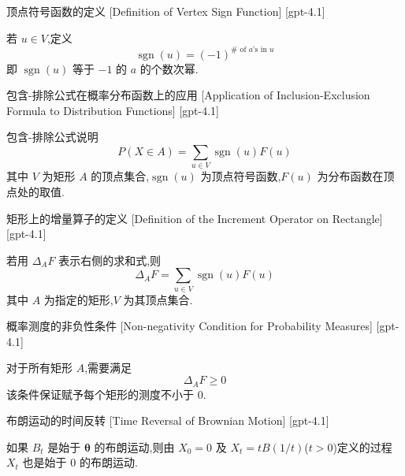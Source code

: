 \documentclass[UTF8]{ctexart}
\begin{document}
    
    
    \begin{dfn}
        {顶点符号函数的定义}
        [Definition of Vertex Sign Function]
        [gpt-4.1]
        
若 $
u \in V$,定义
\[
\operatorname{sgn} ( 
u ) = ( -1 )^{ \# \text{ of } a\text{'s in } 
u }
\]
即 $\operatorname{sgn} ( 
u )$ 等于 $-1$ 的 $a$ 的个数次幂.

    \end{dfn}
    
    
    
    \begin{thm}
        {包含-排除公式在概率分布函数上的应用}
        [Application of Inclusion-Exclusion Formula to Distribution Functions]
        [gpt-4.1]
        
包含-排除公式说明
\[
P ( X \in A ) = \sum_{ 
u \in V } \operatorname{sgn} ( 
u ) F( 
u )
\]
其中 $V$ 为矩形 $A$ 的顶点集合,$\operatorname{sgn}(
u)$ 为顶点符号函数,$F(
u)$ 为分布函数在顶点处的取值.

    \end{thm}
    
    
    
    \begin{dfn}
        {矩形上的增量算子的定义}
        [Definition of the Increment Operator on Rectangle]
        [gpt-4.1]
        
若用 $\Delta_A F$ 表示右侧的求和式,则
\[
\Delta_A F = \sum_{ 
u \in V } \operatorname{sgn} ( 
u ) F( 
u )
\]
其中 $A$ 为指定的矩形,$V$ 为其顶点集合.

    \end{dfn}
    
    
    
    \begin{ppt}
        {概率测度的非负性条件}
        [Non-negativity Condition for Probability Measures]
        [gpt-4.1]
        
对于所有矩形 $A$,需要满足
\[
\Delta_A F \geq 0
\]
该条件保证赋予每个矩形的测度不小于 $0$.

    \end{ppt}
    
    
    
    \begin{thm}
        {布朗运动的时间反转}
        [Time Reversal of Brownian Motion]
        [gpt-4.1]
        
如果 $B_{t}$ 是始于 $\boldsymbol{\theta}$ 的布朗运动,则由 $X_{0}=0$ 及 $X_{t}=t B(1/t)$($t > 0$)定义的过程 $X_{t}$ 也是始于 0 的布朗运动.

    \end{thm}
    
\end{document}
